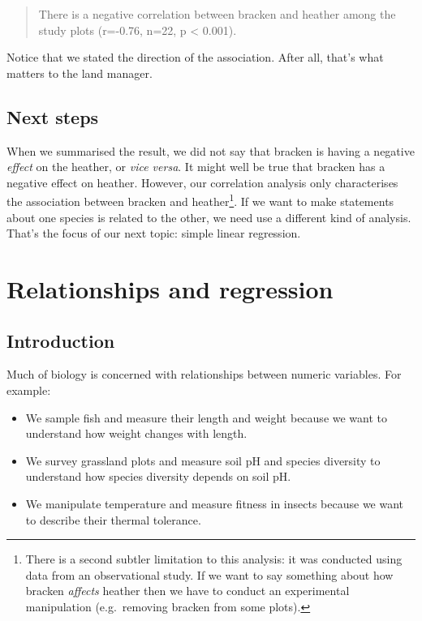 \documentclass[
]{book}
\providecommand{\tightlist}{%
  \setlength{\itemsep}{0pt}\setlength{\parskip}{0pt}}
\begin{document}
\begin{quote}
There is a negative correlation between bracken and heather among the study plots (r=-0.76, n=22, p \textless{} 0.001).
\end{quote}

Notice that we stated the direction of the association. After all, that's what matters to the land manager.

\hypertarget{next-steps}{%
\section{Next steps}\label{next-steps}}

When we summarised the result, we did not say that bracken is having a negative \emph{effect} on the heather, or \emph{vice versa}. It might well be true that bracken has a negative effect on heather. However, our correlation analysis only characterises the association between bracken and heather\footnote{There is a second subtler limitation to this analysis: it was conducted using data from an observational study. If we want to say something about how bracken \emph{affects} heather then we have to conduct an experimental manipulation (e.g.~removing bracken from some plots).}. If we want to make statements about one species is related to the other, we need use a different kind of analysis. That's the focus of our next topic: simple linear regression.

\hypertarget{relationships-and-regression}{%
\chapter{Relationships and regression}\label{relationships-and-regression}}

\hypertarget{introduction-1}{%
\section{Introduction}\label{introduction-1}}

Much of biology is concerned with relationships between numeric variables. For example:

\begin{itemize}
\tightlist
\item
  We sample fish and measure their length and weight because we want to understand how weight changes with length.
\item
  We survey grassland plots and measure soil pH and species diversity to understand how species diversity depends on soil pH.
\item
  We manipulate temperature and measure fitness in insects because we want to describe their thermal tolerance.
\end{itemize}
\end{document}
